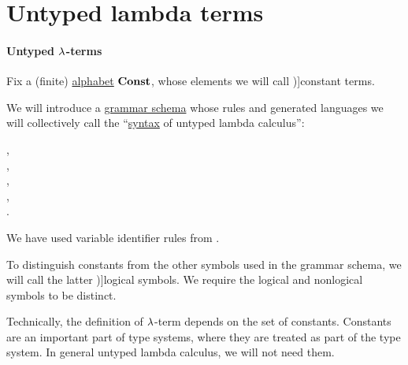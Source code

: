 \section{Untyped lambda terms}\label{sec:untyped_lambda_terms}

\paragraph{Untyped \( \synlambda \)-terms}

\begin{definition}\label{def:lambda_term}\mimprovised
  Fix a (finite) \hyperref[def:formal_language/alphabet]{alphabet} \( \op*{Const} \), whose elements we will call \term[en=constant (\cite[202]{Andrews2002STT})]{constant terms}.

  We will introduce a \hyperref[def:formal_grammar/schema]{grammar schema} whose rules and generated languages we will collectively call the \enquote{\hyperref[con:syntax_semantics_duality]{syntax} of untyped lambda calculus}:
  \begin{bnf*}
        {}, \\
            { \bnfor {}}, \\
     {\bnftsq{\( ( \)} \bnfsp {} \bnfsp {} \bnfsp \bnftsq{\( ) \)}}, \\
     {\bnftsq{\( ( \)} \bnfsp \bnftsq{\( \synlambda \)} \bnfsp {} \bnfsp {} \bnfsp {} \bnfsp \bnftsq{\( ) \)}}, \\
            { \bnfor {} \bnfor {}}.
  \end{bnf*}

  We have used variable identifier rules from .

  To distinguish constants from the other symbols used in the grammar schema, we will call the latter \term[en=logical symbol (\cite[2]{Hinman2005Logic})]{logical symbols}. We require the logical and nonlogical symbols to be distinct.

  \begin{thmenum}
     Technically, the definition of \( \synlambda \)-term depends on the set of constants. Constants are an important part of type systems, where they are treated as part of the type system. In general untyped lambda calculus, we will not need them.


\end{thmenum}
\end{definition}

